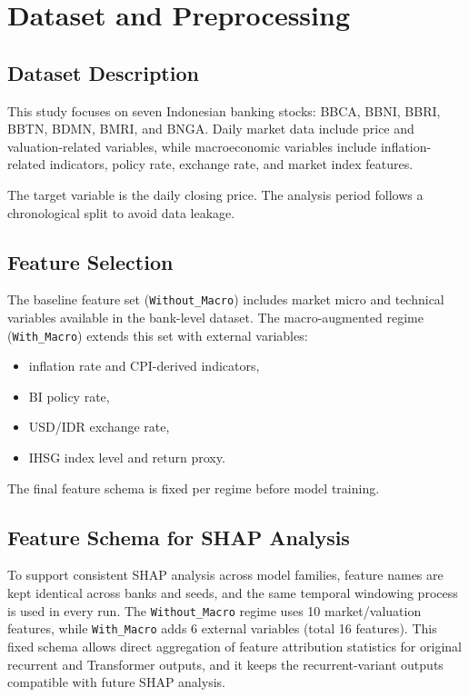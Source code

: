 \section{Dataset and Preprocessing}

\subsection{Dataset Description}
This study focuses on seven Indonesian banking stocks: BBCA, BBNI, BBRI, BBTN, BDMN, BMRI, and BNGA. Daily market data include price and valuation-related variables, while macroeconomic variables include inflation-related indicators, policy rate, exchange rate, and market index features.

The target variable is the daily closing price. The analysis period follows a chronological split to avoid data leakage.

\subsection{Feature Selection}
The baseline feature set (\texttt{Without\_Macro}) includes market micro and technical variables available in the bank-level dataset. The macro-augmented regime (\texttt{With\_Macro}) extends this set with external variables:
\begin{itemize}
    \item inflation rate and CPI-derived indicators,
    \item BI policy rate,
    \item USD/IDR exchange rate,
    \item IHSG index level and return proxy.
\end{itemize}

The final feature schema is fixed per regime before model training.

\subsection{Feature Schema for SHAP Analysis}
To support consistent SHAP analysis across model families, feature names are kept identical across banks and seeds, and the same temporal windowing process is used in every run. The \texttt{Without\_Macro} regime uses 10 market/valuation features, while \texttt{With\_Macro} adds 6 external variables (total 16 features). This fixed schema allows direct aggregation of feature attribution statistics for original recurrent and Transformer outputs, and it keeps the recurrent-variant outputs compatible with future SHAP analysis.

